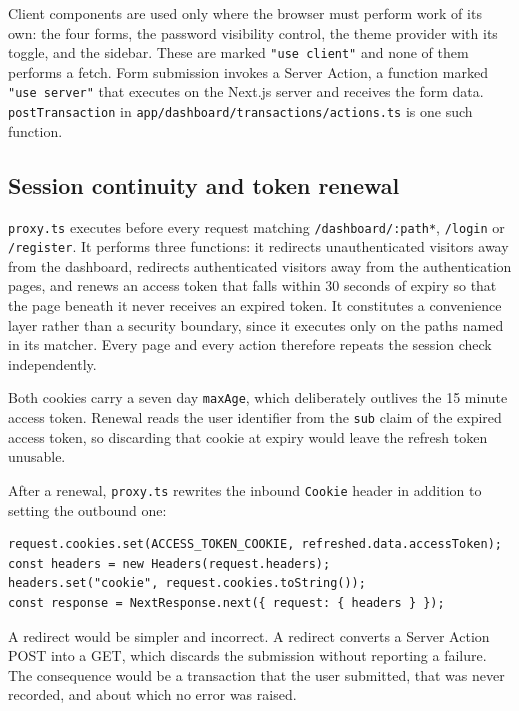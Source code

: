 \documentclass[11pt,a4paper]{article}
\newcommand{\code}[1]{\texttt{\fontsize{8.6}{10}\selectfont #1}}
\begin{document}
Client components are used only where the browser must perform work of its own:
the four forms, the password visibility control, the theme provider with its
toggle, and the sidebar. These are marked \code{"use client"} and none of them
performs a fetch. Form submission invokes a Server Action, a function marked
\code{"use server"} that executes on the Next.js server and receives the form
data. \code{postTransaction} in \code{app/dashboard/transactions/actions.ts} is
one such function.

\subsection{Session continuity and token renewal}

\code{proxy.ts} executes before every request matching \code{/dashboard/:path*},
\code{/login} or \code{/register}. It performs three functions: it redirects
unauthenticated visitors away from the dashboard, redirects authenticated
visitors away from the authentication pages, and renews an access token that
falls within 30 seconds of expiry so that the page beneath it never receives an
expired token. It constitutes a convenience layer rather than a security
boundary, since it executes only on the paths named in its matcher. Every page
and every action therefore repeats the session check independently.

Both cookies carry a seven day \code{maxAge}, which deliberately outlives the
15 minute access token. Renewal reads the user identifier from the \code{sub}
claim of the expired access token, so discarding that cookie at expiry would
leave the refresh token unusable.

After a renewal, \code{proxy.ts} rewrites the inbound \code{Cookie} header in
addition to setting the outbound one:

\begin{lstlisting}
request.cookies.set(ACCESS_TOKEN_COOKIE, refreshed.data.accessToken);
const headers = new Headers(request.headers);
headers.set("cookie", request.cookies.toString());
const response = NextResponse.next({ request: { headers } });
\end{lstlisting}

A redirect would be simpler and incorrect. A redirect converts a Server Action
POST into a GET, which discards the submission without reporting a failure. The
consequence would be a transaction that the user submitted, that was never
recorded, and about which no error was raised.
\end{document}
